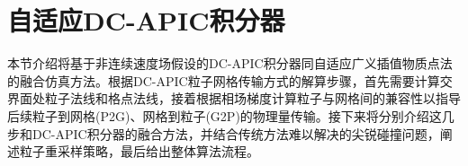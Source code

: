 

\section{自适应DC-APIC积分器}
本节介绍将基于非连续速度场假设的DC-APIC积分器同自适应广义插值物质点法的融合仿真方法。根据DC-APIC粒子网格传输方式的解算步骤，首先需要计算交界面处粒子法线和格点法线，接着根据相场梯度计算粒子与网格间的兼容性以指导后续粒子到网格(P2G)、网格到粒子(G2P)的物理量传输。接下来将分别介绍这几步和DC-APIC积分器的融合方法，并结合传统方法难以解决的尖锐碰撞问题，阐述粒子重采样策略，最后给出整体算法流程。

